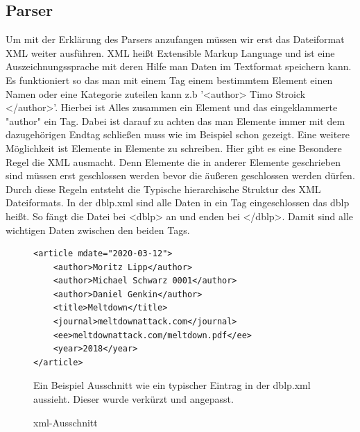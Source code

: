 \documentclass[a4paper,12pt]{article}
\begin{document}
	\subsection{Parser}
	Um mit der Erklärung des Parsers anzufangen müssen wir erst das Dateiformat XML weiter ausführen. XML heißt Extensible Markup Language und ist eine Auszeichnungssprache mit deren Hilfe man Daten im Textformat speichern kann. Es funktioniert so das man mit einem Tag einem bestimmtem Element einen Namen oder eine Kategorie zuteilen kann z.b '<author> Timo Stroick </author>'. Hierbei ist Alles zusammen ein Element und das eingeklammerte "author" ein Tag. Dabei ist darauf zu achten das man Elemente immer mit dem dazugehörigen Endtag schließen muss wie im Beispiel schon gezeigt. Eine weitere Möglichkeit ist Elemente in Elemente zu schreiben. Hier gibt es eine Besondere Regel die XML ausmacht. Denn Elemente die in anderer Elemente geschrieben sind müssen erst geschlossen werden bevor die äußeren geschlossen werden dürfen. Durch diese Regeln entsteht die Typische hierarchische Struktur des XML Dateiformats. In der dblp.xml sind alle Daten in ein Tag eingeschlossen das dblp heißt. So fängt die Datei bei <dblp> an und enden bei </dblp>. Damit sind alle wichtigen Daten zwischen den beiden Tags. 
	
	\begin{figure}[!htb]
	\lstset{language=XML}
		\begin{lstlisting}
<article mdate="2020-03-12">
	<author>Moritz Lipp</author>
	<author>Michael Schwarz 0001</author>
	<author>Daniel Genkin</author>
	<title>Meltdown</title>
	<journal>meltdownattack.com</journal>
	<ee>meltdownattack.com/meltdown.pdf</ee>
	<year>2018</year>
</article>
	\end{lstlisting}
	\caption{xml-Ausschnitt}
	Ein Beispiel Ausschnitt wie ein typischer Eintrag in der dblp.xml aussieht. Dieser wurde verkürzt und angepasst.
	\end{figure}
	
\end{document}
